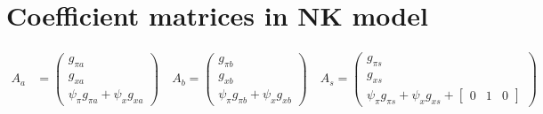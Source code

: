 \documentclass[11pt]{article}
\def \myBibPath {../../literature/}
\renewcommand{\[}{\begin{equation}}
\renewcommand{\]}{\end{equation}}
\begin{document}

\clearpage
\newpage

%


\newpage
\appendix
\section{Coefficient matrices in NK model}\label{app_A_matrices}
\begin{align}
A_a & = \begin{pmatrix} g_{\pi a} \\ g_{x a} \\ \psi_{\pi}g_{\pi a} + \psi_xg_{x a}
\end{pmatrix}
\quad A_b = \begin{pmatrix} g_{\pi b} \\ g_{x b} \\ \psi_{\pi}g_{\pi b} + \psi_xg_{x b}
\end{pmatrix}
 \quad A_s = \begin{pmatrix} g_{\pi s} \\ g_{x s} \\ \psi_{\pi}g_{\pi s} + \psi_xg_{x s} + \begin{bmatrix} 0 & 1& 0\end{bmatrix}

\end{pmatrix}
\end{align}
\end{document}
